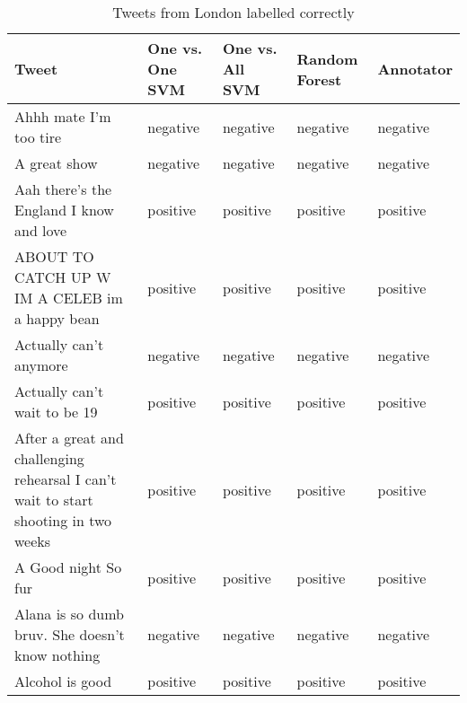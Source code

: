 \begin{table}[ht]
	\caption{Tweets from London labelled correctly}
	\begin{tabular}{|p{5cm}|p{1.8cm}|p{1.8cm}|p{1.8cm}|p{1.8cm}|} \hline
	Tweet & One vs. One SVM &One vs. All SVM &Random Forest & Annotator\\ \hline
	Ahhh mate I'm too tire & negative & negative & negative & negative \\ \hline
	A great show & negative & negative & negative & negative \\ \hline
	 Aah there's the England I know and love  & positive& positive& positive& positive \\ \hline
	ABOUT TO CATCH UP W IM A CELEB im a happy bean & positive & positive & positive& positive \\ \hline
	Actually can't anymore  & negative& negative& negative& negative \\ \hline

	Actually can't wait to be 19 & positive& positive& positive& positive \\ \hline
	After a great and challenging rehearsal I can't wait to start shooting in two weeks & positive & positive & positive &positive \\ \hline
	A Good night So fur & positive& positive& positive& positive \\ \hline
	Alana is so dumb bruv. She doesn't know nothing & negative & negative& negative& negative\\ \hline
	Alcohol is good & positive& positive& positive& positive\\ \hline



	\end{tabular}
	\label{tab:correct_tweets_en}
\end{table}



